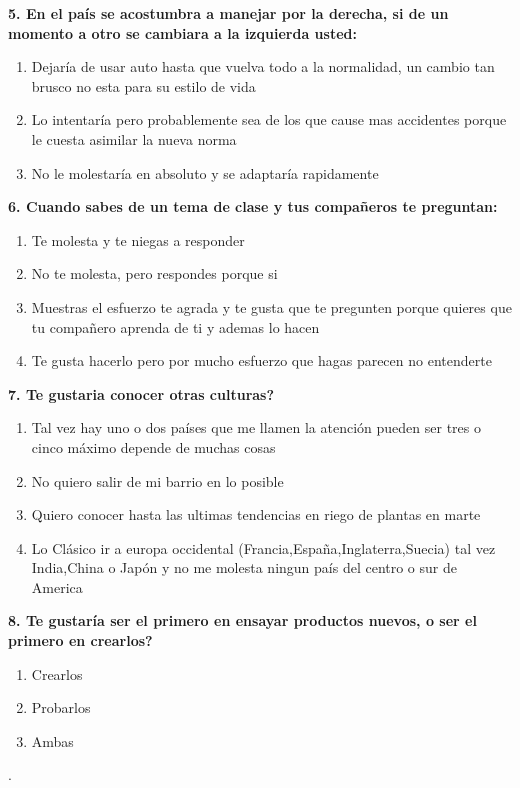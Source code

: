 \documentclass{article}
\begin{document}
\textbf{5. En el país se acostumbra a manejar por la derecha, si de un momento a otro se cambiara a la izquierda usted:}
\begin{enumerate}[label=(\Alph*)] 
\item Dejaría de usar auto hasta que vuelva todo a la normalidad, un cambio tan brusco no esta para su estilo de vida
\item Lo intentaría pero probablemente sea de los que cause mas accidentes porque le cuesta asimilar la nueva norma
\item No le molestaría en absoluto y se adaptaría rapidamente
\end{enumerate}



 \textbf{6. Cuando sabes de un tema de clase y tus compañeros te preguntan:}
\begin{enumerate}[label=(\Alph*)]
\item Te molesta y te niegas a responder
\item No te molesta, pero respondes porque si
\item Muestras el esfuerzo te agrada y te gusta que te pregunten porque quieres que tu compañero aprenda de ti y ademas lo hacen
\item Te gusta hacerlo pero por mucho esfuerzo que hagas parecen no entenderte 
 \end{enumerate}


\textbf{7. Te gustaria conocer otras culturas?}
\begin{enumerate}[label=(\Alph*)]
\item Tal vez hay uno o dos países que me llamen la atención pueden ser tres o cinco máximo depende de muchas cosas
\item No quiero salir de mi barrio en lo posible
\item Quiero conocer hasta las ultimas tendencias en riego de plantas en marte
\item Lo Clásico ir a europa occidental (Francia,España,Inglaterra,Suecia) tal vez India,China o Japón y no me molesta ningun país del centro o sur de America 
 \end{enumerate}


\textbf{8. Te gustaría ser el primero en ensayar productos nuevos, o ser el primero en crearlos?}

\begin{enumerate}[label=(\Alph*)]
\item Crearlos
\item Probarlos 
\item Ambas
\end{enumerate}.
\end{document}
